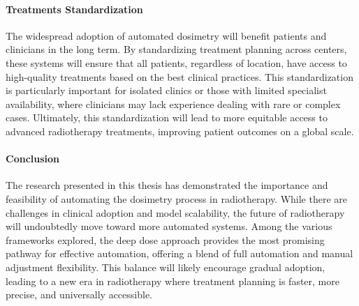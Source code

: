 \paragraph{Treatments Standardization}
The widespread adoption of automated dosimetry will benefit patients and clinicians in the long term.
By standardizing treatment planning across centers, these systems will ensure that all patients, regardless of location, have access to high-quality treatments based on the best clinical practices.
This standardization is particularly important for isolated clinics or those with limited specialist availability, where clinicians may lack experience dealing with rare or complex cases.
Ultimately, this standardization will lead to more equitable access to advanced radiotherapy treatments, improving patient outcomes on a global scale.

\paragraph{Conclusion}
The research presented in this thesis has demonstrated the importance and feasibility of automating the dosimetry process in radiotherapy.
While there are challenges in clinical adoption and model scalability, the future of radiotherapy will undoubtedly move toward more automated systems.
Among the various frameworks explored, the deep dose approach provides the most promising pathway for effective automation, offering a blend of full automation and manual adjustment flexibility.
This balance will likely encourage gradual adoption, leading to a new era in radiotherapy where treatment planning is faster, more precise, and universally accessible.
